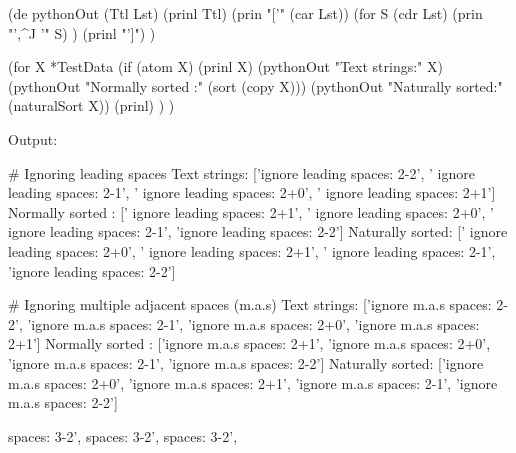 \begin{wideverbatim}

(de pythonOut (Ttl Lst)
   (prinl Ttl)
   (prin "['" (car Lst))
   (for S (cdr Lst)
      (prin "',^J '" S) )
   (prinl "']") )

(for X *TestData
   (if (atom X)
      (prinl X)
      (pythonOut "Text strings:" X)
      (pythonOut "Normally sorted :" (sort (copy X)))
      (pythonOut "Naturally sorted:" (naturalSort X))
      (prinl) ) )

Output:

# Ignoring leading spaces
Text strings:
['ignore leading spaces: 2-2',
 ' ignore leading spaces: 2-1',
 '  ignore leading spaces: 2+0',
 '   ignore leading spaces: 2+1']
Normally sorted :
['   ignore leading spaces: 2+1',
 '  ignore leading spaces: 2+0',
 ' ignore leading spaces: 2-1',
 'ignore leading spaces: 2-2']
Naturally sorted:
['  ignore leading spaces: 2+0',
 '   ignore leading spaces: 2+1',
 ' ignore leading spaces: 2-1',
 'ignore leading spaces: 2-2']

# Ignoring multiple adjacent spaces (m.a.s)
Text strings:
['ignore m.a.s spaces: 2-2',
 'ignore m.a.s  spaces: 2-1',
 'ignore m.a.s   spaces: 2+0',
 'ignore m.a.s    spaces: 2+1']
Normally sorted :
['ignore m.a.s    spaces: 2+1',
 'ignore m.a.s   spaces: 2+0',
 'ignore m.a.s  spaces: 2-1',
 'ignore m.a.s spaces: 2-2']
Naturally sorted:
['ignore m.a.s   spaces: 2+0',
 'ignore m.a.s    spaces: 2+1',
 'ignore m.a.s  spaces: 2-1',
 'ignore m.a.s spaces: 2-2']

\end{wideverbatim}


spaces: 3-2',
spaces: 3-2',
spaces: 3-2',



